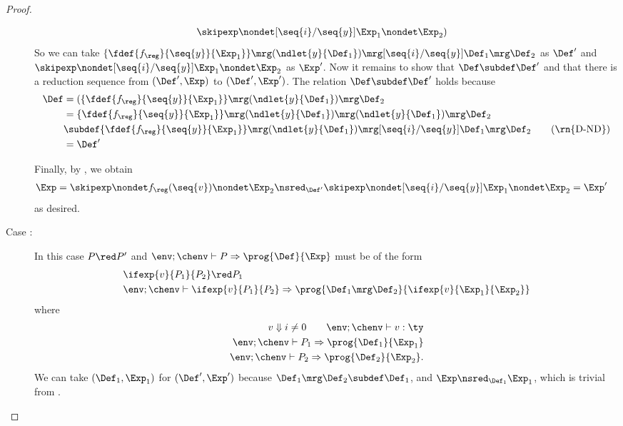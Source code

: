 \begin{proof}
\begin{description}
\begin{align*}
\begin{aligned}
        &\skipexp \nondet [\seq{i}/\seq{y}]\Exp_1 \nondet \Exp_2)
      \end{aligned}
    \end{align*}
    So we can take \( \{ \fdef{f_\reg}{\seq{y}}{\Exp_1} \} \mrg (\ndlet{y}{\Def_1}) \mrg  [\seq{i}/\seq{y}]\Def_1 \mrg \Def_2 \) as  \( \Def' \) and \( \skipexp \nondet [\seq{i}/\seq{y}]\Exp_1 \nondet \Exp_2 \) as \( \Exp' \).
    Now it remains to show that \( \Def \subdef \Def' \) and that there is a reduction sequence from \( (\Def', \Exp) \) to \( (\Def', \Exp') \).
    The relation \( \Def \subdef \Def' \) holds because
    \begin{align*}
      \Def
      &= (\{ \fdef{f_\reg}{\seq{y}}{\Exp_1} \} \mrg (\ndlet{y}{\Def_1}) \mrg \Def_2 \\
      &= \{ \fdef{f_\reg}{\seq{y}}{\Exp_1} \} \mrg (\ndlet{y}{\Def_1}) \mrg (\ndlet{y}{\Def_1}) \mrg \Def_2 \\
      &\subdef \{ \fdef{f_\reg}{\seq{y}}{\Exp_1} \} \mrg (\ndlet{y}{\Def_1}) \mrg [\seq{i} / \seq{y}]{\Def_1} \mrg \Def_2 \tag{\rn{D-ND}} \\
      &=\Def'
    \end{align*}

    Finally, by , we obtain
    \begin{align*}
      \Exp &= \skipexp \nondet f_\reg (\seq{v}) \nondet \Exp_2  \nsred_{\Def'} \skipexp \nondet [\seq{i}/\seq{y}]\Exp_1 \nondet \Exp_2  = \Exp'
    \end{align*}
    as desired.
    \item[Case \rn{R-If-T}:]
      In this case \( P \red P' \) and \( \env; \chenv \vdash P \Rightarrow
      \prog{\Def}{\Exp} \) must be of the form
      \begin{align*}
      &\ifexp{v}{P_1}{P_2} \red P_1 \\
        &\env; \chenv \vdash \ifexp{v} {P_1}{P_2} \Rightarrow
        \prog{\Def_1 \mrg \Def_2}{\ifexp{v}{\Exp_1}{\Exp_2}}
      \end{align*}
      where
      \begin{align*}
        v \Downarrow i \neq 0  \qquad \env; \chenv \vdash v : \ty \\
        \env; \chenv \vdash P_1 \Rightarrow \prog{\Def_1}{\Exp_1} \\
        \env; \chenv \vdash P_2 \Rightarrow \prog{\Def_2}{\Exp_2}.
      \end{align*}
    We can take \( (\Def_1, \Exp_1) \) for \( ( \Def', \Exp' )\) because \( \Def_1 \mrg \Def_2 \subdef \Def_1 \), and \( \Exp \nsred_{\Def_1} \Exp_1 \), which is trivial from .


\end{description}
\end{proof}
